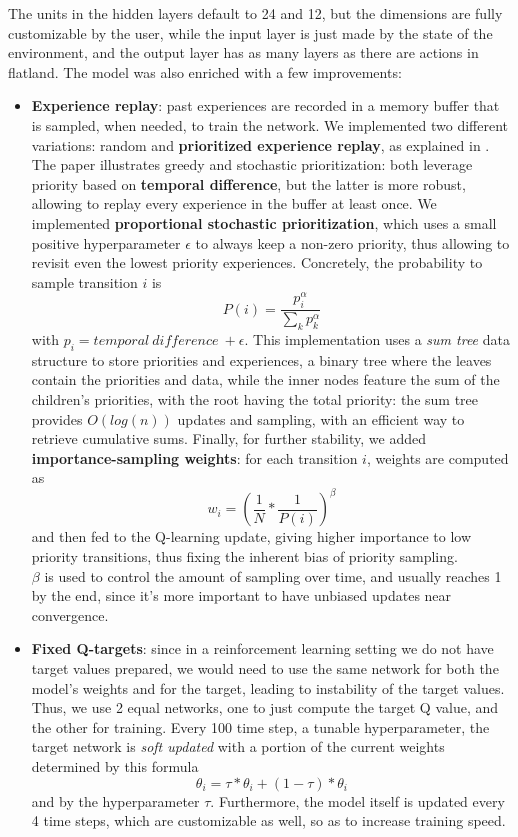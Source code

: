 \noindent 
The units in the hidden layers default to 24 and 12, but the dimensions are fully customizable by the user, while the input layer is just made by the state of the environment, and the output layer has as many layers as there are actions in flatland. The model was also enriched with a few improvements:
\begin{itemize}
\item \textbf{Experience replay}:  past experiences are recorded in a memory buffer that is sampled, when needed, to train the network. We implemented two different variations: random and \textbf{prioritized experience replay}, as explained in \cite{priority}. The paper illustrates greedy and stochastic prioritization: both leverage priority based on \textbf{temporal difference}, but the latter is more robust, allowing to replay every experience in the buffer at least once. We implemented \textbf{proportional stochastic prioritization}, which uses a small positive hyperparameter $\epsilon$ to always keep a non-zero priority, thus allowing to revisit even the lowest priority experiences. Concretely, the probability to sample transition $i$ is $$P(i) = \frac{p_i^\alpha}{\sum_k p_k^\alpha}$$ with $p_i = temporal\ difference\ + \epsilon$. This implementation uses a \textit{sum tree} data structure to store priorities and experiences, a binary tree where the leaves contain the priorities and data, while the inner nodes feature the sum of the children's priorities, with the root having the total priority: the sum tree provides $O(log(n))$ updates and sampling, with an efficient way to retrieve cumulative sums. Finally, for further stability, we added \textbf{importance-sampling weights}: for each transition $i$, weights are computed as $$w_i = (\frac{1}{N} * \frac{1}{P(i)})^\beta$$ and then fed to the Q-learning update, giving higher importance to low priority transitions, thus fixing the inherent bias of priority sampling.\\
$\beta$ is used to control the amount of sampling over time, and usually reaches 1 by the end, since it's more important to have unbiased updates near convergence.
\item \textbf{Fixed Q-targets}: since in a reinforcement learning setting we do not have target values prepared, we would need to use the same network for both the model's weights and for the target, leading to instability of the target values. Thus, we use 2 equal networks, one to just compute the target Q value, and the other for training. Every 100 time step, a tunable hyperparameter, the target network is \textit{soft updated} with a portion of the current weights determined by this formula $$\theta_i = \tau * \theta_i + (1 - \tau) * \theta_i$$ and by the hyperparameter $\tau$. Furthermore, the model itself is updated every 4 time steps, which are customizable as well, so as to increase training speed. 

\end{itemize}
